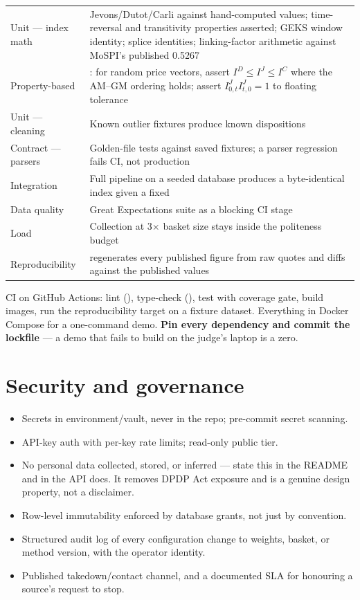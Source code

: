 \begin{center}
\footnotesize
\begin{tabularx}{\textwidth}{@{}L{3.4cm} X@{}}
\toprule
{} &  \\
\midrule
Unit --- index math & Jevons/Dutot/Carli against hand-computed values; time-reversal and transitivity properties asserted; GEKS window identity; splice identities; linking-factor arithmetic against MoSPI's published 0.5267 \\
Property-based & : for random price vectors, assert $I^D \le I^J \le I^C$ where the AM--GM ordering holds; assert $I^J_{0,t}I^J_{t,0}=1$ to floating tolerance \\
Unit --- cleaning & Known outlier fixtures produce known dispositions \\
Contract --- parsers & Golden-file tests against saved fixtures; a parser regression fails CI, not production \\
Integration & Full pipeline on a seeded database produces a byte-identical index given a fixed  \\
Data quality & Great Expectations suite as a blocking CI stage \\
Load & Collection at 3$\times$ basket size stays inside the politeness budget \\
Reproducibility &  regenerates every published figure from raw quotes and diffs against the published values \\
\bottomrule
\end{tabularx}
\end{center}

\noindent CI on GitHub Actions: lint (), type-check (), test with
coverage gate, build images, run the reproducibility target on a fixture dataset. Everything
in Docker Compose for a one-command demo. \textbf{Pin every dependency and commit the
lockfile} --- a demo that fails to build on the judge's laptop is a zero.

\section{Security and governance}

\begin{itemize}
\item Secrets in environment/vault, never in the repo; pre-commit secret scanning.
\item API-key auth with per-key rate limits; read-only public tier.
\item No personal data collected, stored, or inferred --- state this in the README and in
the API docs. It removes DPDP Act exposure and is a genuine design property, not a
disclaimer.
\item Row-level immutability enforced by database grants, not just by convention.
\item Structured audit log of every configuration change to weights, basket, or method
version, with the operator identity.
\item Published takedown/contact channel, and a documented SLA for honouring a source's
request to stop.
\end{itemize}

